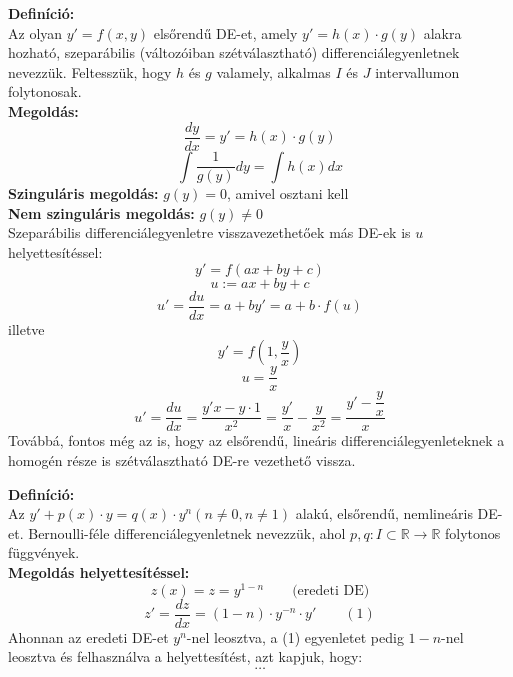 \documentclass[11pt,a4paper]{article}
\begin{document}
    \begin{tcolorbox}[colback=red!5!white,colframe=red!60!black,title= 1. Szeparábilis és arra visszavezethető DE]
        \textbf{Definíció:} \\
        Az olyan $y' = f(x,y)$ elsőrendű DE-et, amely $y' = h(x) \cdot g(y)$ alakra hozható, szeparábilis (változóiban szétválasztható) differenciálegyenletnek nevezzük. Feltesszük, hogy $h$ és $g$ valamely, alkalmas $I$ és $J$ intervallumon folytonosak. \\
        \textbf{Megoldás:} \\
        $$\dfrac{dy}{dx} = y' = h(x) \cdot g(y)$$
        $$\int\dfrac{1}{g(y)}dy = \int h(x)dx$$
        \textbf{Szinguláris megoldás:} $g(y) = 0$, amivel osztani kell \\
        \textbf{Nem szinguláris megoldás:} $g(y) \neq 0$ \\
        Szeparábilis differenciálegyenletre visszavezethetőek más DE-ek is $u$ helyettesítéssel:
        $$y' = f(ax + by + c)$$
        $$u := ax + by + c$$
        $$u' = \dfrac{du}{dx} = a + by' = a + b \cdot f(u)$$
        illetve
        $$y' = f(1,\dfrac{y}{x})$$
        $$u = \dfrac{y}{x}$$
        $$u' = \dfrac{du}{dx} = \dfrac{y'x - y \cdot 1}{x^2} = \dfrac{y'}{x} - \dfrac{y}{x^2} = \dfrac{y' - \dfrac{y}{x}}{x}$$
        Továbbá, fontos még az is, hogy az elsőrendű, lineáris differenciálegyenleteknek a homogén része is szétválasztható DE-re vezethető vissza.
    \end{tcolorbox}
    \begin{tcolorbox}[colback=red!5!white,colframe=red!60!black,title= 2. Bernoulli-féle DE]
       \textbf{Definíció:} \\
       Az $y' + p(x) \cdot y = q(x) \cdot y^n (n \neq 0, n \neq 1)$ alakú, elsőrendű, nemlineáris DE-et. Bernoulli-féle differenciálegyenletnek nevezzük, ahol $p, q: I \subset \mathbb{R} \rightarrow \mathbb{R}$ folytonos függvények. \\
       \textbf{Megoldás helyettesítéssel:} \\
       $$z(x) = z = y^{1-n} \quad\quad \text{(eredeti DE)}$$
       $$z' = \dfrac{dz}{dx} = (1-n) \cdot y^{-n} \cdot y' \quad\quad (1)$$
       Ahonnan az eredeti DE-et $y^n$-nel leosztva, a (1) egyenletet pedig $1-n$-nel leosztva és felhasználva a helyettesítést, azt kapjuk, hogy:
       $$\dots$$
    \end{tcolorbox}
\end{document}
